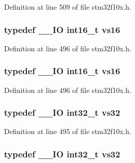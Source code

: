 Definition at line 509 of file stm32f10x.\+h.

\subsubsection[{\texorpdfstring{vs16}{vs16}}]{\setlength{\rightskip}{0pt plus 5cm}typedef {\bf \+\_\+\+\_\+\+IO} {\bf int16\+\_\+t} {\bf vs16}}\hypertarget{group___exported__types_ga19c9450d60abff7c6d3d35f31c10f83e}{}\label{group___exported__types_ga19c9450d60abff7c6d3d35f31c10f83e}


Definition at line 496 of file stm32f10x.\+h.

\subsubsection[{\texorpdfstring{vs16}{vs16}}]{\setlength{\rightskip}{0pt plus 5cm}typedef {\bf \+\_\+\+\_\+\+IO} {\bf int16\+\_\+t} {\bf vs16}}\hypertarget{group___exported__types_ga19c9450d60abff7c6d3d35f31c10f83e}{}\label{group___exported__types_ga19c9450d60abff7c6d3d35f31c10f83e}


Definition at line 496 of file stm32f10x.\+h.

\subsubsection[{\texorpdfstring{vs32}{vs32}}]{\setlength{\rightskip}{0pt plus 5cm}typedef {\bf \+\_\+\+\_\+\+IO} {\bf int32\+\_\+t} {\bf vs32}}\hypertarget{group___exported__types_ga476e2cb441f8e689433350ae2eeee510}{}\label{group___exported__types_ga476e2cb441f8e689433350ae2eeee510}


Definition at line 495 of file stm32f10x.\+h.

\subsubsection[{\texorpdfstring{vs32}{vs32}}]{\setlength{\rightskip}{0pt plus 5cm}typedef {\bf \+\_\+\+\_\+\+IO} {\bf int32\+\_\+t} {\bf vs32}}\hypertarget{group___exported__types_ga476e2cb441f8e689433350ae2eeee510}{}\label{group___exported__types_ga476e2cb441f8e689433350ae2eeee510}


